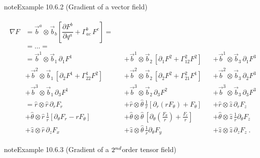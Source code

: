 \documentclass[letterpaper,10pt,english]{jupyterBook}
\begin{document}
\begin{sphinxadmonition}{note}{Example 10.6.2 (Gradient of a vector field)}




\begin{equation*}
\begin{split}\begin{aligned}
  \nabla F 
  & = \vec{b}^a \otimes \vec{b}_b \left[ \dfrac{\partial F^b}{\partial q^a} + \Gamma_{ac}^b \, F^c \right] = \\
  & = \dots = \\
  & =  \vec{b}^1 \otimes \vec{b}_1 \, \partial_1 F^1 
  && + \vec{b}^1 \otimes \vec{b}_2 \, \left[ \partial_1 F^2 + \Gamma_{12}^2 F^2 \right]
  && + \vec{b}^1 \otimes \vec{b}_3 \, \partial_1 F^3 \\
  &  + \vec{b}^2 \otimes \vec{b}_1 \, \left[ \partial_2 F^1 + \Gamma_{22}^1 F^2 \right]
  && + \vec{b}^2 \otimes \vec{b}_2 \, \left[ \partial_2 F^2 + \Gamma_{21}^2 F^1 \right]
  && + \vec{b}^2 \otimes \vec{b}_3 \, \partial_2 F^3 \\
  &  + \vec{b}^3 \otimes \vec{b}_1 \, \partial_3 F^1 
  && + \vec{b}^3 \otimes \vec{b}_2 \, \partial_3 F^2 
  && + \vec{b}^3 \otimes \vec{b}_3 \, \partial_3 F^3 \\
  &  = \hat{r     } \otimes \hat{r     } \, \partial_r F_r   
  && + \hat{r     } \otimes \hat{\theta} \, \frac{1}{r} \left[ \partial_r (r F_{\theta}) + F_{\theta} \right]
  && + \hat{r     } \otimes \hat{z     } \, \partial_r F_z \\
  &  + \hat{\theta} \otimes \hat{r     } \, \frac{1}{r} \left[ \partial_\theta F_r - r F_{\theta} \right]
  && + \hat{\theta} \otimes \hat{\theta} \, \left[ \partial_\theta \left( \frac{F_\theta}{r} \right) + \frac{F_r}{r} \right]
  && + \hat{\theta} \otimes \hat{z     } \, \frac{1}{r} \partial_{\theta} F_z \\
  &  + \hat{z     } \otimes \hat{r     } \, \partial_z F_x   
  && + \hat{z     } \otimes \hat{\theta} \, \frac{1}{r} \partial_\theta F_y   
  && + \hat{z     } \otimes \hat{z     } \, \partial_z F_z \ .
\end{aligned}\end{split}
\end{equation*}\end{sphinxadmonition}
\label{ch/tensor-algebra-calculus/calculus-euclidean-cylindrical:example-2}
\begin{sphinxadmonition}{note}{Example 10.6.3 (Gradient of a \protect\(2^{nd}\protect\)\sphinxhyphen{}order tensor field)}


\end{sphinxadmonition}
\end{document}

